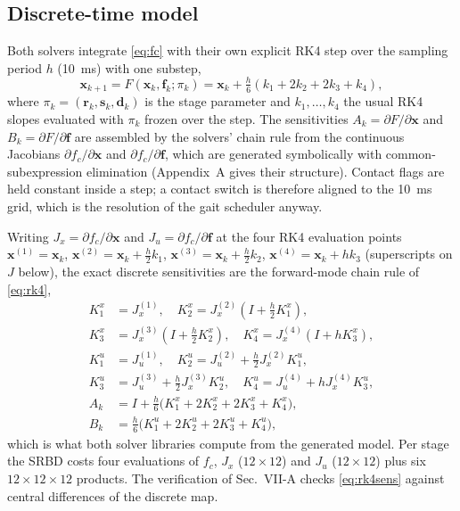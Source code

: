 \documentclass[11pt]{article}
\newcommand{\bx}{\bm{x}}\newcommand{\bu}{\bm{u}}\newcommand{\bw}{\bm{w}}\newcommand{\by}{\bm{y}}
\newcommand{\bfv}{\bm{f}}\newcommand{\br}{\bm{r}}\newcommand{\bd}{\bm{d}}\newcommand{\bs}{\bm{s}}
\begin{document}
\subsection{Discrete-time model}
Both solvers integrate \eqref{eq:fc} with their own explicit RK4 step over the sampling period $h$ (10~ms) with one substep,
\begin{equation}
\bx_{k+1}=F(\bx_k,\bfv_k;\pi_k)=\bx_k+\tfrac{h}{6}(k_1+2k_2+2k_3+k_4),
\label{eq:rk4}
\end{equation}
where $\pi_k=(\br_k,\bs_k,\bd_k)$ is the stage parameter and $k_1,\dots,k_4$ the usual RK4 slopes evaluated with $\pi_k$ frozen over the step. The sensitivities $A_k=\partial F/\partial\bx$ and $B_k=\partial F/\partial\bfv$ are assembled by the solvers' chain rule from the continuous Jacobians $\partial f_c/\partial\bx$ and $\partial f_c/\partial\bfv$, which are generated symbolically with common-subexpression elimination (Appendix~A gives their structure). Contact flags are held constant inside a step; a contact switch is therefore aligned to the 10~ms grid, which is the resolution of the gait scheduler anyway.

Writing $J_x=\partial f_c/\partial\bx$ and $J_u=\partial f_c/\partial\bfv$ at the four RK4 evaluation points $\bx^{(1)}=\bx_k$, $\bx^{(2)}=\bx_k+\tfrac h2k_1$, $\bx^{(3)}=\bx_k+\tfrac h2k_2$, $\bx^{(4)}=\bx_k+hk_3$ (superscripts on $J$ below), the exact discrete sensitivities are the forward-mode chain rule of \eqref{eq:rk4},
\begin{equation}
\begin{aligned}
K^x_1&=J_x^{(1)},\quad K^x_2=J_x^{(2)}(I+\tfrac h2K^x_1),\\
K^x_3&=J_x^{(3)}(I+\tfrac h2K^x_2),\quad K^x_4=J_x^{(4)}(I+hK^x_3),\\
K^u_1&=J_u^{(1)},\quad K^u_2=J_u^{(2)}+\tfrac h2J_x^{(2)}K^u_1,\\
K^u_3&=J_u^{(3)}+\tfrac h2J_x^{(3)}K^u_2,\quad K^u_4=J_u^{(4)}+hJ_x^{(4)}K^u_3,\\
A_k&=I+\tfrac h6\big(K^x_1+2K^x_2+2K^x_3+K^x_4\big),\\
B_k&=\tfrac h6\big(K^u_1+2K^u_2+2K^u_3+K^u_4\big),
\end{aligned}
\label{eq:rk4sens}
\end{equation}
which is what both solver libraries compute from the generated model. Per stage the SRBD costs four evaluations of $f_c$, $J_x$ ($12\times12$) and $J_u$ ($12\times12$) plus six $12\times12\times12$ products. The verification of Sec.~VII-A checks \eqref{eq:rk4sens} against central differences of the discrete map.
\end{document}
